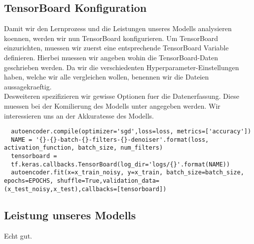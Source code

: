 \subsection{TensorBoard Konfiguration}
Damit wir den Lernprozess und die Leistungen unseres Modells analysieren
koennen, werden wir nun TensorBoard konfigurieren.
Um TensorBoard einzurichten, muessen wir zuerst eine entsprechende TensorBoard
Variable definieren. Hierbei muessen wir angeben wohin die TensorBoard-Daten
geschrieben werden. Da wir die verschiedenten Hyperparameter-Einstellungen
haben, welche wir alle vergleichen wollen, benennen wir die Dateien
aussagekraeftig. \\
Desweiteren spezifizieren wir gewisse Optionen fuer die Datenerfassung.
Diese muessen bei der Komilierung des Modells unter  angegeben
werden. Wir interessieren uns an der Akkuratesse des Modells.
\begin{verbatim}
  autoencoder.compile(optimizer='sgd',loss=loss, metrics=['accuracy'])
  NAME = '{}-{}-batch-{}-filters-{}-denoiser'.format(loss, activation_function, batch_size, num_filters)
  tensorboard =
  tf.keras.callbacks.TensorBoard(log_dir='logs/{}'.format(NAME))
  autoencoder.fit(x=x_train_noisy, y=x_train, batch_size=batch_size, epochs=EPOCHS, shuffle=True,validation_data=(x_test_noisy,x_test),callbacks=[tensorboard])
\end{verbatim}

\subsection{Leistung unseres Modells}
Echt gut.

